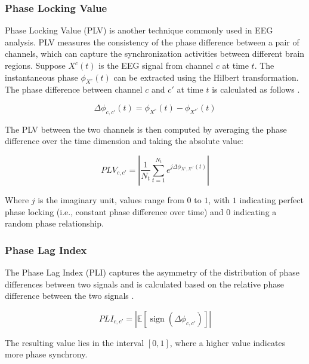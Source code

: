 \subsubsection{Phase Locking Value}

Phase Locking Value (PLV) is another technique commonly used in EEG analysis. PLV measures the consistency of the phase difference between a pair of channels, which can capture the synchronization activities between different brain regions. Suppose $X^{c}(t)$ is the EEG signal from channel $c$ at time $t$. The instantaneous phase $\phi_{X^{c}}(t)$ can be extracted using the Hilbert transformation. The phase difference between channel $c$ and $c'$ at time $t$ is calculated as follows \cite{cattai2021phase}.

\begin{equation}
 \Delta \phi_{c,c'}(t) = \phi_{X^{c}}(t) - \phi_{X^{c'}}(t)    
\end{equation}

The PLV between the two channels is then computed by averaging the phase difference over the time dimension and taking the absolute value:

\begin{equation}
PLV_{c,c'}=\left| \frac {1}{N_t}\sum_{t=1}^{N_t} e^{j\Delta \phi_{X^{c},X^{c'}}(t)} \right|    
\end{equation}

Where $j$ is the imaginary unit, values range from $0$ to $1$, with $1$ indicating perfect phase locking (i.e., constant phase difference over time) and $0$ indicating a random phase relationship.

\subsubsection{Phase Lag Index}

The Phase Lag Index (PLI) captures the asymmetry of the distribution of phase differences between two signals and is calculated based on the relative phase difference between the two signals \cite{siviero2023functional}.

\begin{equation}
    PLI_{c,c'}=|\mathbb{E}[\operatorname{sign}(\Delta \phi_{c,c'})]|    
\end{equation}


The resulting value lies in the interval $[0,1]$, where a higher value indicates more phase synchrony.

